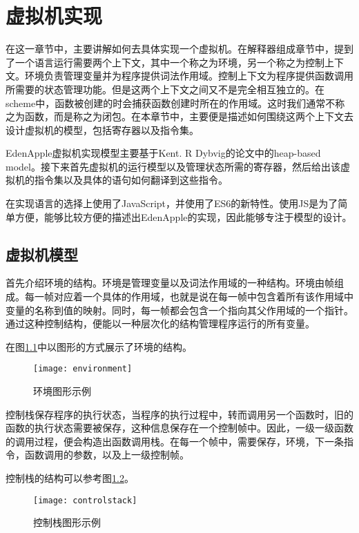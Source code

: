 
\chapter{虚拟机实现}
\label{ch:vm impl}

在这一章节中，主要讲解如何去具体实现一个虚拟机。在解释器组成章节中，提到了一个语言运行需要两个上下文，其中一个称之为环境，另一个称之为控制上下文。环境负责管理变量并为程序提供词法作用域。控制上下文为程序提供函数调用所需要的状态管理功能。但是这两个上下文之间又不是完全相互独立的。在scheme中，函数被创建的时会捕获函数创建时所在的作用域。这时我们通常不称之为函数，而是称之为闭包。在本章节中，主要便是描述如何围绕这两个上下文去设计虚拟机的模型，包括寄存器以及指令集。

EdenApple虚拟机实现模型主要基于Kent. R Dybvig的论文\cite{dybvig87timpl}中的heap-based model。接下来首先虚拟机的运行模型以及管理状态所需的寄存器，然后给出该虚拟机的指令集以及具体的语句如何翻译到这些指令。

在实现语言的选择上使用了JavaScript，并使用了ES6的新特性。使用JS是为了简单方便，能够比较方便的描述出EdenApple的实现，因此能够专注于模型的设计。

\section{虚拟机模型}

首先介绍环境的结构。环境是管理变量以及词法作用域的一种结构。环境由帧组成。每一帧对应着一个具体的作用域，也就是说在每一帧中包含着所有该作用域中变量的名称到值的映射。同时，每一帧都会包含一个指向其父作用域的一个指针。通过这种控制结构，便能以一种层次化的结构管理程序运行的所有变量。

在图\ref{fig:env sample}中以图形的方式展示了环境的结构。

\begin{figure}
\begin{center}
\texttt{[image: environment]}
\end{center}
\caption{环境图形示例}
\label{fig:env sample}
\end{figure}

控制栈保存程序的执行状态，当程序的执行过程中，转而调用另一个函数时，旧的函数的执行状态需要被保存，这种信息保存在一个控制帧中。因此，一级一级函数的调用过程，便会构造出函数调用栈。在每一个帧中，需要保存，环境，下一条指令，函数调用的参数，以及上一级控制帧。

控制栈的结构可以参考图\ref{fig:control stack sample}。

\begin{figure}
\begin{center}
\texttt{[image: controlstack]}
\end{center}
\caption{控制栈图形示例}
\label{fig:control stack sample}
\end{figure}

